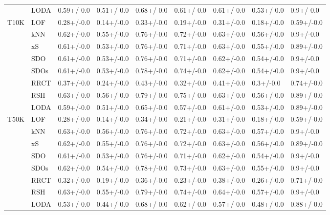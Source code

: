 \begin{table}
\begin{tabular}{lllllllll}
      & LODA &  0.59+/-0.0 &  0.51+/-0.0 &  0.68+/-0.0 &  0.61+/-0.0 &  0.61+/-0.0 &   0.53+/-0.0 &    0.9+/-0.0 \\
T10K & LOF &  0.28+/-0.0 &  0.14+/-0.0 &  0.33+/-0.0 &  0.19+/-0.0 &  0.31+/-0.0 &   0.18+/-0.0 &   0.59+/-0.0 \\
      & kNN &  0.62+/-0.0 &  0.55+/-0.0 &  0.76+/-0.0 &  0.72+/-0.0 &  0.63+/-0.0 &   0.56+/-0.0 &    0.9+/-0.0 \\
      & xS &  0.61+/-0.0 &  0.53+/-0.0 &  0.76+/-0.0 &  0.71+/-0.0 &  0.63+/-0.0 &   0.55+/-0.0 &   0.89+/-0.0 \\
      & SDO &  0.61+/-0.0 &  0.53+/-0.0 &  0.76+/-0.0 &  0.71+/-0.0 &  0.62+/-0.0 &   0.54+/-0.0 &    0.9+/-0.0 \\
      & SDOs &  0.61+/-0.0 &  0.53+/-0.0 &  0.78+/-0.0 &  0.74+/-0.0 &  0.62+/-0.0 &   0.54+/-0.0 &    0.9+/-0.0 \\
      & RRCT &  0.37+/-0.0 &  0.24+/-0.0 &  0.43+/-0.0 &  0.32+/-0.0 &  0.41+/-0.0 &    0.3+/-0.0 &   0.74+/-0.0 \\
      & RSH &  0.63+/-0.0 &  0.56+/-0.0 &  0.79+/-0.0 &  0.75+/-0.0 &  0.63+/-0.0 &   0.56+/-0.0 &   0.89+/-0.0 \\
      & LODA &  0.59+/-0.0 &  0.51+/-0.0 &  0.65+/-0.0 &  0.57+/-0.0 &  0.61+/-0.0 &   0.53+/-0.0 &   0.89+/-0.0 \\
T50K & LOF &  0.28+/-0.0 &  0.14+/-0.0 &  0.34+/-0.0 &  0.21+/-0.0 &  0.31+/-0.0 &   0.18+/-0.0 &   0.59+/-0.0 \\
      & kNN &  0.63+/-0.0 &  0.56+/-0.0 &  0.76+/-0.0 &  0.72+/-0.0 &  0.63+/-0.0 &   0.57+/-0.0 &    0.9+/-0.0 \\
      & xS &  0.62+/-0.0 &  0.55+/-0.0 &  0.76+/-0.0 &  0.72+/-0.0 &  0.63+/-0.0 &   0.56+/-0.0 &   0.89+/-0.0 \\
      & SDO &  0.61+/-0.0 &  0.53+/-0.0 &  0.76+/-0.0 &  0.71+/-0.0 &  0.62+/-0.0 &   0.54+/-0.0 &    0.9+/-0.0 \\
      & SDOs &  0.62+/-0.0 &  0.54+/-0.0 &  0.78+/-0.0 &  0.73+/-0.0 &  0.63+/-0.0 &   0.55+/-0.0 &    0.9+/-0.0 \\
      & RRCT &  0.32+/-0.0 &  0.19+/-0.0 &  0.36+/-0.0 &  0.23+/-0.0 &  0.38+/-0.0 &   0.26+/-0.0 &   0.71+/-0.0 \\
      & RSH &  0.63+/-0.0 &  0.55+/-0.0 &  0.79+/-0.0 &  0.74+/-0.0 &  0.64+/-0.0 &   0.57+/-0.0 &    0.9+/-0.0 \\
      & LODA &  0.53+/-0.0 &  0.44+/-0.0 &  0.68+/-0.0 &  0.62+/-0.0 &  0.57+/-0.0 &   0.48+/-0.0 &   0.88+/-0.0 \\

\end{tabular}
\end{table}
